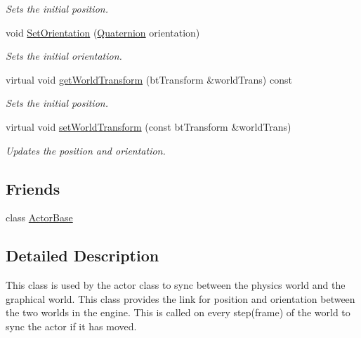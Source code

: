 \begin{DoxyCompactItemize}
\begin{DoxyCompactList}\small\item\em Sets the initial position. \item\end{DoxyCompactList}\item 
void \hyperlink{classPhysMotionState_a3de0041d9fd078dcdea0db97a1c9e3e2}{SetOrientation} (\hyperlink{classphys_1_1Quaternion}{Quaternion} orientation)
\begin{DoxyCompactList}\small\item\em Sets the initial orientation. \item\end{DoxyCompactList}\item 
virtual void \hyperlink{classPhysMotionState_ad7f6fc932da90cc2a718fbe809d95287}{getWorldTransform} (btTransform \&worldTrans) const 
\begin{DoxyCompactList}\small\item\em Sets the initial position. \item\end{DoxyCompactList}\item 
virtual void \hyperlink{classPhysMotionState_a57c23b922e2c5e8af87dc1318796ec8b}{setWorldTransform} (const btTransform \&worldTrans)
\begin{DoxyCompactList}\small\item\em Updates the position and orientation. \item\end{DoxyCompactList}\end{DoxyCompactItemize}
\subsection*{Friends}
\begin{DoxyCompactItemize}
\item 
\hypertarget{classPhysMotionState_ac09063d4b0192680ba3aa0bd4003a274}{
class \hyperlink{classPhysMotionState_ac09063d4b0192680ba3aa0bd4003a274}{ActorBase}}
\label{d2/d14/classPhysMotionState_ac09063d4b0192680ba3aa0bd4003a274}

\end{DoxyCompactItemize}


\subsection{Detailed Description}
This class is used by the actor class to sync between the physics world and the graphical world. This class provides the link for position and orientation between the two worlds in the engine. This is called on every step(frame) of the world to sync the actor if it has moved. 

